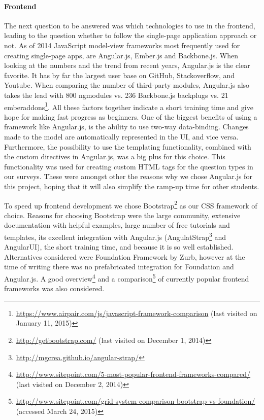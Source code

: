 	\paragraph{Frontend}

		The next question to be answered was which technologies to use in the frontend, leading to the question whether to follow the single-page application approach or not. As of 2014 JavaScript model-view frameworks most frequently used for creating single-page apps, are Angular.js, Ember.js and Backbone.js. When looking at the numbers and the trend from recent years, Angular.js is the clear favorite. It has by far the largest user base on GitHub, Stackoverflow, and Youtube. When comparing the number of third-party modules, Angular.js also takes the lead with 800 ngmodules vs. 236 Backbone.js backplugs vs. 21 emberaddons\footnote{\url{https://www.airpair.com/js/javascript-framework-comparison} (last visited on January 11, 2015)}. All these factors together indicate a short training time and give hope for making fast progress as beginners. 
		One of the biggest benefits of using a framework like Angular.js, is the ability to use two-way data-binding. Changes made to the model are automatically represented in the UI, and vice versa. Furthermore, the possibility to use the templating functionality, combined with the custom directives in Angular.js, was a big plus for this choice. This functionality was used for creating custom HTML tags for the question types in our surveys. These were amongst other the reasons why we chose Angular.js for this project, hoping that it will also simplify the ramp-up time for other students.

		To speed up frontend development we chose Bootstrap\footnote{\url{http://getbootstrap.com/} (last visited on December 1, 2014)} as our CSS framework of choice. Reasons for choosing Bootstrap were the large community, extensive documentation with helpful examples, large number of free tutorials and templates, its excellent integration with Angular.js (AngulatStrap\footnote{\url{http://mgcrea.github.io/angular-strap/}} and AngularUI), the short training time, and because it is so well established.
		Alternatives considered were Foundation Framework by Zurb, however at the time of writing there was no prefabricated integration for Foundation and Angular.js.
		A good overview\footnote{\url{http://www.sitepoint.com/5-most-popular-frontend-frameworks-compared/} (last visited on December 2, 2014)} and a comparison\footnote{\url{http://www.sitepoint.com/grid-system-comparison-bootstrap-vs-foundation/} (accessed March 24, 2015)} of currently popular frontend frameworks was also considered.

